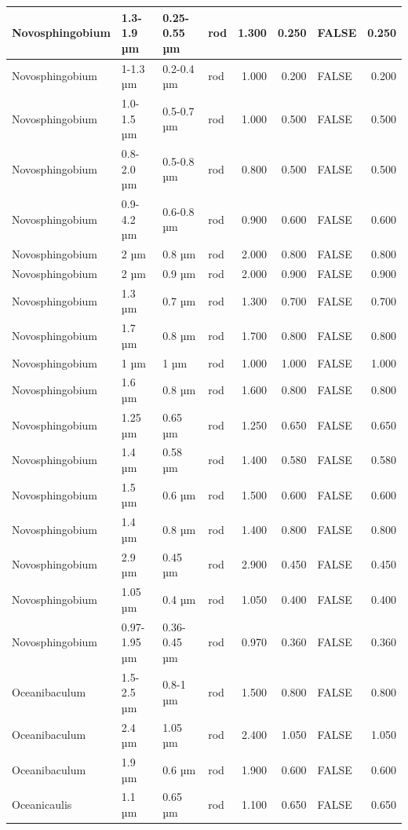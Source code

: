 \documentclass[
]{article}
\begin{document}
\begin{table}
\begin{tabular}{l|l|l|l|r|r|l|r}
\hline
Novosphingobium & 1.3-1.9 µm & 0.25-0.55 µm & rod & 1.300 & 0.250 & FALSE & 0.250\\
\hline
Novosphingobium & 1-1.3 µm & 0.2-0.4 µm & rod & 1.000 & 0.200 & FALSE & 0.200\\
\hline
Novosphingobium & 1.0-1.5 µm & 0.5-0.7 µm & rod & 1.000 & 0.500 & FALSE & 0.500\\
\hline
Novosphingobium & 0.8-2.0 µm & 0.5-0.8 µm & rod & 0.800 & 0.500 & FALSE & 0.500\\
\hline
Novosphingobium & 0.9-4.2 µm & 0.6-0.8 µm & rod & 0.900 & 0.600 & FALSE & 0.600\\
\hline
Novosphingobium & 2 µm & 0.8 µm & rod & 2.000 & 0.800 & FALSE & 0.800\\
\hline
Novosphingobium & 2 µm & 0.9 µm & rod & 2.000 & 0.900 & FALSE & 0.900\\
\hline
Novosphingobium & 1.3 µm & 0.7 µm & rod & 1.300 & 0.700 & FALSE & 0.700\\
\hline
Novosphingobium & 1.7 µm & 0.8 µm & rod & 1.700 & 0.800 & FALSE & 0.800\\
\hline
Novosphingobium & 1 µm & 1 µm & rod & 1.000 & 1.000 & FALSE & 1.000\\
\hline
Novosphingobium & 1.6 µm & 0.8 µm & rod & 1.600 & 0.800 & FALSE & 0.800\\
\hline
Novosphingobium & 1.25 µm & 0.65 µm & rod & 1.250 & 0.650 & FALSE & 0.650\\
\hline
Novosphingobium & 1.4 µm & 0.58 µm & rod & 1.400 & 0.580 & FALSE & 0.580\\
\hline
Novosphingobium & 1.5 µm & 0.6 µm & rod & 1.500 & 0.600 & FALSE & 0.600\\
\hline
Novosphingobium & 1.4 µm & 0.8 µm & rod & 1.400 & 0.800 & FALSE & 0.800\\
\hline
Novosphingobium & 2.9 µm & 0.45 µm & rod & 2.900 & 0.450 & FALSE & 0.450\\
\hline
Novosphingobium & 1.05 µm & 0.4 µm & rod & 1.050 & 0.400 & FALSE & 0.400\\
\hline
Novosphingobium & 0.97-1.95 µm & 0.36-0.45 µm & rod & 0.970 & 0.360 & FALSE & 0.360\\
\hline
Oceanibaculum & 1.5-2.5 µm & 0.8-1 µm & rod & 1.500 & 0.800 & FALSE & 0.800\\
\hline
Oceanibaculum & 2.4 µm & 1.05 µm & rod & 2.400 & 1.050 & FALSE & 1.050\\
\hline
Oceanibaculum & 1.9 µm & 0.6 µm & rod & 1.900 & 0.600 & FALSE & 0.600\\
\hline
Oceanicaulis & 1.1 µm & 0.65 µm & rod & 1.100 & 0.650 & FALSE & 0.650\\

\end{tabular}
\end{table}
\end{document}
